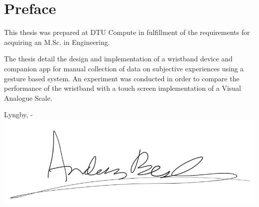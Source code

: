 \chapter{Preface}

This thesis was prepared at DTU Compute in fulfillment of the requirements for acquiring an M.Sc. in Engineering.

The thesis detail the design and implementation of a wristband device and companion app for manual collection of data on subjective experiences using a gesture based system. An experiment was conducted in order to compare the performance of the wristband with a touch screen implementation of a Visual Analogue Scale.

\vspace{20mm}
\begin{center}
    \hspace{20mm} Lyngby, \thesishandin-\thesisyear
    \vspace{5mm}
    \newline
    \includegraphics[scale=0.3]{Signature.png}
\end{center}
\begin{flushright}
    \thesisauthor
\end{flushright}
